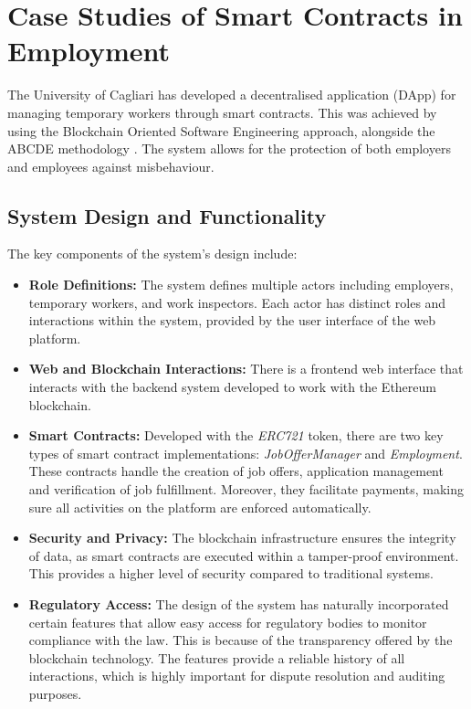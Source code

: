 \section{Case Studies of Smart Contracts in Employment}

The University of Cagliari has developed a decentralised application (DApp) for managing temporary workers through smart contracts. This was achieved by using the Blockchain Oriented Software Engineering approach, alongside the ABCDE methodology \cite{lallaiETAL2020software}. The system allows for the protection of both employers and employees against misbehaviour.

\subsection{System Design and Functionality}

The key components of the system's design include:

\begin{itemize}
    \item \textbf{Role Definitions:} The system defines multiple actors including employers, temporary workers, and work inspectors. Each actor has distinct roles and interactions within the system, provided by the user interface of the web platform.
    \item \textbf{Web and Blockchain Interactions:} There is a frontend web interface that interacts with the backend system developed to work with the Ethereum blockchain. 
    \item \textbf{Smart Contracts:} Developed with the \textit{ERC721} token, there are two key types of smart contract implementations: \textit{JobOfferManager} and \textit{Employment}. These contracts handle the creation of job offers, application management and verification of job fulfillment. Moreover, they facilitate payments, making sure all activities on the platform are enforced automatically.
    \item \textbf{Security and Privacy:} The blockchain infrastructure ensures the integrity of data, as smart contracts are executed within a tamper-proof environment. This provides a higher level of security compared to traditional systems.
    \item \textbf{Regulatory Access:} The design of the system has naturally incorporated certain features that allow easy access for regulatory bodies to monitor compliance with the law. This is because of the transparency offered by the blockchain technology. The features provide a reliable history of all interactions, which is highly important for dispute resolution and auditing purposes.
\end{itemize}

